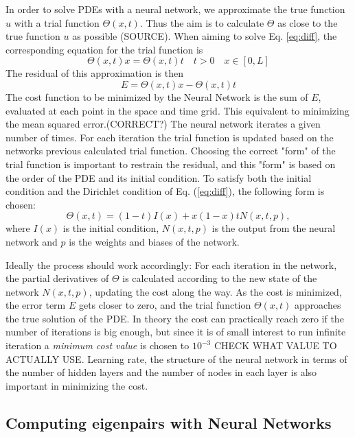 \documentclass[a4paper,11pt,twocolumn]{article}
\begin{document}
In order to solve PDEs with a neural network, we approximate the true function $u$ with a trial function $\Theta (x,t)$. Thus the aim is to calculate $\Theta$ as close to the true function $u$ as possible \cite{lagaris1998artificial} (SOURCE). When aiming to solve Eq. \eqref{eq:diff}, the corresponding equation for the trial function is
\begin{equation*}
   {\Theta(x,t)}{x} = {\Theta(x,t)}{t} \quad t>0 \quad x\in [0,L]
\end{equation*}
The residual of this approximation is then
\begin{equation}
    E = {\Theta(x,t)}{x} - {\Theta(x,t)}{t}
    \label{eq:error}
\end{equation}
The cost function to be minimized by the Neural Network is the sum of $E$, evaluated at each point in the space and time grid. This equivalent to minimizing the mean squared error.(CORRECT?) The neural network iterates a given number of times. For each iteration the trial function is updated based on the networks previous calculated trial function. Choosing the correct "form" of the trial function is important to restrain the residual, and this "form" is based on the order of the PDE and its initial condition. To satisfy both the initial condition and the Dirichlet condition of Eq. (\ref{eq:diff}), the following form is chosen:
\begin{equation}
    \Theta (x,t) = (1-t)I(x) + x(1-x)tN(x,t,p),
    \label{eq:trial}
\end{equation}
where $I(x)$ is the initial condition, $N(x,t,p)$ is the output from the neural network and $p$ is the weights and biases of the network. 

Ideally the process should work accordingly: For each iteration in the network, the partial derivatives of $\Theta$ is calculated according to the new state of the network $N(x, t, p)$, updating the cost along the way. As the cost is minimized, the error term $E$ gets closer to zero, and the trial function $\Theta (x,t)$ approaches the true solution of the PDE. In theory the cost can practically reach zero if the number of iterations is big enough, but since it is of small interest to run infinite iteration a \textit{minimum cost value} is chosen to $10^{-3}$ CHECK WHAT VALUE TO ACTUALLY USE. Learning rate, the structure of the neural network in terms of the number of hidden layers and the number of nodes in each layer is also important in minimizing the cost. 

\subsection{Computing eigenpairs with Neural Networks}
\end{document}
